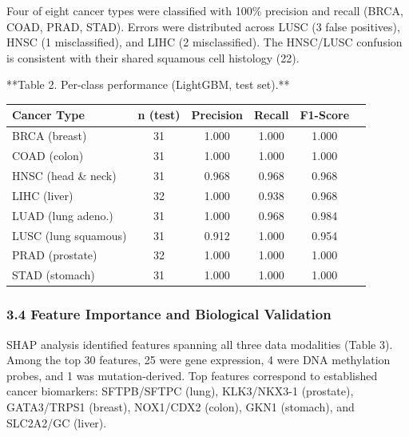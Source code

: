 Four of eight cancer types were classified with 100\% precision and
recall (BRCA, COAD, PRAD, STAD). Errors were distributed across LUSC (3
false positives), HNSC (1 misclassified), and LIHC (2 misclassified).
The HNSC/LUSC confusion is consistent with their shared squamous cell
histology (22).

**Table 2. Per-class performance (LightGBM, test set).**
\begin{center}
\begin{tabular}{lccccc}
\toprule
\textbf{Cancer Type} & \textbf{n (test)} & \textbf{Precision} & \textbf{Recall} & \textbf{F1-Score} \\
\midrule
BRCA (breast) & 31 & 1.000 & 1.000 & 1.000 \\
COAD (colon) & 31 & 1.000 & 1.000 & 1.000 \\
HNSC (head \& neck) & 31 & 0.968 & 0.968 & 0.968 \\
LIHC (liver) & 32 & 1.000 & 0.938 & 0.968 \\
LUAD (lung adeno.) & 31 & 1.000 & 0.968 & 0.984 \\
LUSC (lung squamous) & 31 & 0.912 & 1.000 & 0.954 \\
PRAD (prostate) & 32 & 1.000 & 1.000 & 1.000 \\
STAD (stomach) & 31 & 1.000 & 1.000 & 1.000 \\
\bottomrule
\end{tabular}
\end{center}

\subsubsection{3.4 Feature Importance and Biological
Validation}\label{feature-importance-and-biological-validation}

SHAP analysis identified features spanning all three data modalities
(Table 3). Among the top 30 features, 25 were gene expression, 4 were
DNA methylation probes, and 1 was mutation-derived. Top features
correspond to established cancer biomarkers: SFTPB/SFTPC (lung),
KLK3/NKX3-1 (prostate), GATA3/TRPS1 (breast), NOX1/CDX2 (colon), GKN1
(stomach), and SLC2A2/GC (liver).

